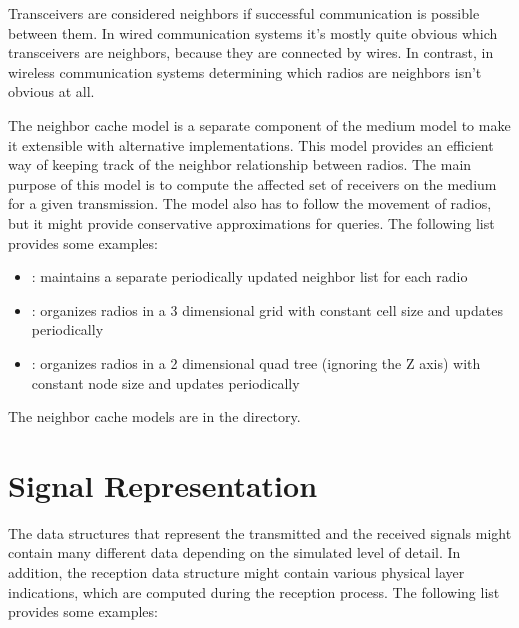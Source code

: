 Transceivers are considered neighbors if successful communication is possible
between them. In wired communication systems it's mostly quite obvious which
transceivers are neighbors, because they are connected by wires. In contrast,
in wireless communication systems determining which radios are neighbors isn't
obvious at all. 

The neighbor cache model is a separate component of the medium model to make it
extensible with alternative implementations. This model provides an efficient
way of keeping track of the neighbor relationship between radios. The main
purpose of this model is to compute the affected set of receivers on the medium
for a given transmission. The model also has to follow the movement of radios,
but it might provide conservative approximations for queries. The following list
provides some examples:

\begin{itemize}
  \item {}: maintains a separate periodically updated 
neighbor list for each radio
  \item {}: organizes radios in a 3 dimensional grid
with constant cell size and updates periodically
  \item {}: organizes radios in a 2 dimensional
quad tree (ignoring the Z axis) with constant node size and updates periodically
\end{itemize}

The neighbor cache models are in the 
directory.

\section{Signal Representation}

The data structures that represent the transmitted and the received signals
might contain many different data depending on the simulated level of detail. In
addition, the reception data structure might contain various physical layer
indications, which are computed during the reception process. The following list
provides some examples:

